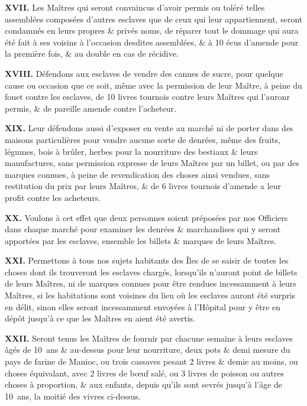 \documentclass[twoside]{book} %
\newcommand{\labelchar}[1]{\textbf{\color{rubric} #1}}
\begin{document}
\labelchar{XVII.} Les Maîtres qui seront convaincus d’avoir permis ou toléré telles assemblées composées d’autres esclaves que de ceux qui leur appartiennent, seront condamnés en leurs propres \& privés noms, de réparer tout le dommage qui aura été fait à ses voisins à l’occasion desdites assemblées, \& à 10 écus d’amende pour la première fois, \& au double en cas de récidive.\par
\labelchar{XVIII.} Défendons aux esclaves de vendre des cannes de sucre, pour quelque cause ou occasion que ce soit, même avec la permission de leur Maître, à peine du fouet contre les esclaves, de 10 livres tournois contre leurs Maîtres qui l’auronr permis, \& de pareille amende contre l’acheteur.\par
\labelchar{XIX.} Leur défendons aussi d’exposer en vente au marché ni de porter dans des maisons particulières pour vendre aucune sorte de denrées, même des fruits, légumes, bois à brûler, herbes pour la nourriture des bestiaux \& leurs manufactures, sans permission expresse de leurs Maîtres par un billet, ou par des marques connues, à peine de revendication des choses ainsi vendues, sans restitution du prix par leurs Maîtres, \& de 6 livres tournois d’amende a leur profit contre les acheteurs.\par
\labelchar{XX.} Voulons à cet effet que deux personnes soient préposées par nos Officiers dans chaque marché pour examiner les denrées \& marchandises qui y seront apportées par les esclaves, ensemble les billets \& marques de leurs Maîtres.\par
\labelchar{XXI.} Permettons à tous nos sujets habitants des Îles de se saisir de toutes les choses dont ils trouveront les esclaves chargés, lorsqu’ils n’auront point de billets de leurs Maîtres, ni de marques connues pour être rendues incessamment à leurs Maîtres, si les habitations sont voisines du lieu où les esclaves auront été surpris en délit, sinon elles seront incessamment envoyées à l’Hôpital pour y être en dépôt jusqu’à ce que les Maîtres en aient été avertis.\par
\labelchar{XXII.} Seront tenus les Maîtres de fournir par chacune semaine à leurs esclaves âgés de 10 ans \& au-dessus pour leur nourriture, deux pots \& demi mesure du pays de farine de Manioc, ou trois cassaves pesant 2 livres \& demie au moins, ou choses équivalant, avec 2 livres de bœuf salé, ou 3 livres de poisson ou autres choses à proportion, \& aux enfants, depuis qu’ils sont sevrés jusqu’à l’âge de 10 ans, la moitié des vivres ci-dessus.\par
\end{document}
